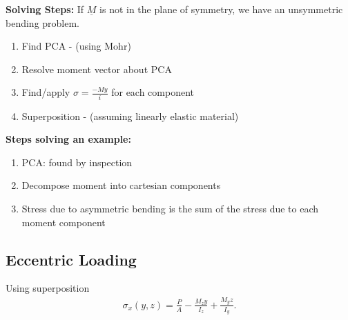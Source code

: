 \documentclass{article}
\numberwithin{equation}{subsection}
\begin{document}
\textbf{Solving Steps:}
If ${\underline{M}}$ is not in the plane of symmetry, we have an unsymmetric bending problem.
\begin{enumerate}
  \item Find PCA - (using Mohr)
  \item Resolve moment vector about PCA
  \item Find/apply $\sigma = \frac{-My}{i}$ for each component
  \item Superposition - (assuming linearly elastic material)
\end{enumerate}

\textbf{Steps solving an example:}
\begin{enumerate}
  \item PCA: found by inspection
  \item Decompose moment into cartesian components
  \item Stress due to asymmetric bending is the sum of the stress due to each moment component
\end{enumerate}

\subsection{Eccentric Loading}
Using superposition
\begin{align*}
  \sigma_x(y,z) = \frac{P}{A} - \frac{M_z y}{I_z} + \frac{M_y z}{I_y}.
\end{align*}
\end{document}
